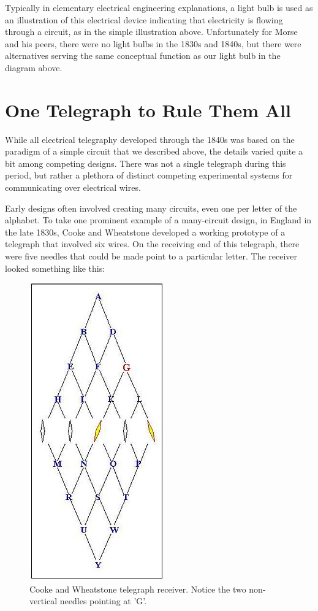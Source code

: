 \documentclass[UTF8]{book}
\begin{document}
\begin{CJK}{UTF8}{gbsn}
Typically in elementary electrical engineering explanations, a light bulb is used as an illustration of this electrical device indicating that electricity is flowing through a circuit, as in the simple illustration above. Unfortunately for Morse and his peers, there were no light bulbs in the 1830s and 1840s, but there were alternatives serving the same conceptual function as our light bulb in the diagram above.

\section{One Telegraph to Rule Them All}

While all electrical telegraphy developed through the 1840s was based on the paradigm of a simple circuit that we described above, the details varied quite a bit among competing designs. There was not a single telegraph during this period, but rather a plethora of distinct competing experimental systems for communicating over electrical wires.

Early designs often involved creating many circuits, even one per letter of the alphabet. To take one prominent example of a many-circuit design, in England in the late 1830s, Cooke and Wheatstone developed a working prototype of a telegraph that involved six wires. On the receiving end of this telegraph, there were five needles that could be made point to a particular letter. The receiver looked something like this:

\begin{figure}[H]
\centering
\includegraphics[width=0.4\linewidth]{wheatstone}
\caption{Cooke and Wheatstone telegraph receiver. Notice the two non-vertical needles pointing at 'G'.}
\end{figure}


\end{CJK}
\end{document}
